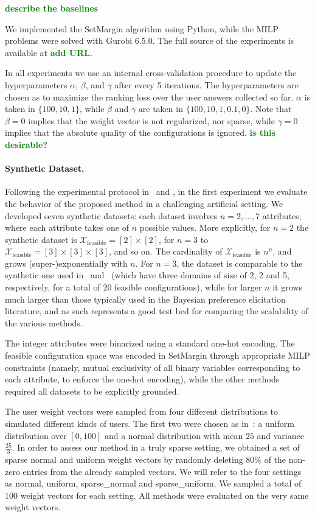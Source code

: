\documentclass{article}
\renewcommand\[{\begin{equation}}
\renewcommand\]{\end{equation}}
\newcommand{\calvar}[1]{\ensuremath{\mathcal{#1}}}
\newcommand{\calX}{\calvar{X}}
\newcommand{\stefano}[1]{{\bf \textcolor{green}{{\fbox{Stefano:} #1}}}}
\begin{document}
\stefano{describe the baselines}

We implemented the {\sc SetMargin} algorithm using Python, while the MILP
problems were solved with Gurobi 6.5.0. The full source of the experiments is
available at \stefano{add URL}.

In all experiments we use an internal cross-validation procedure to update the
hyperparameters $\alpha$, $\beta$, and $\gamma$ after every 5 iterations. The
hyperparameters are chosen as to maximize the ranking loss over the user
answers collected so far. $\alpha$ is taken in $\{100, 10, 1\}$,
while $\beta$ and $\gamma$ are taken in $\{100, 10, 1, 0.1, 0\}$. Note that
$\beta=0$ implies that the weight vector is not regularized, nor sparse, while
$\gamma=0$ implies that the absolute quality of the configurations is ignored.
\stefano{is this desirable?}

\paragraph{Synthetic Dataset.} Following the experimental protocol
in~\cite{guo2010real} and \cite{viappiani2010optimal}, in the first experiment
we evaluate the behavior of the proposed method in a challenging artificial
setting. We developed seven synthetic datasets: each dataset involves
$n=2,\ldots,7$ attributes, where each attribute takes one of $n$ possible
values. More explicitly, for $n=2$ the synthetic dataset is
$\calX_\text{feasible} = [2] \times [2]$, for $n=3$ to $\calX_\text{feasible} =
[3] \times [3] \times [3]$, and so on. The cardinality of
$\calX_\text{feasible}$ is $n^n$, and grows (super-)exponentially with $n$. For
$n=3$, the dataset is comparable to the synthetic one used
in~\cite{guo2010real} and~\cite{viappiani2010optimal} (which have three domains
of size of 2, 2 and 5, respectively, for a total of 20 feasible
configurations), while for larger $n$ it grows much larger than those typically
used in the Bayesian preference elicitation literature, and as such represents
a good test bed for comparing the scalability of the various methods.

The integer attributes were binarized using a standard one-hot encoding. The
feasible configuration space was encoded in {\sc SetMargin} through appropriate
MILP constraints (namely, mutual exclusivity of all binary variables
corresponding to each attribute, to enforce the one-hot encoding), while the
other methods required all datasets to be explicitly grounded.

The user weight vectors were sampled from four different distributions to
simulated different kinds of users. The first two were chosen as
in~\cite{guo2010real}: a uniform distribution over $[0, 100]$ and a normal
distribution with mean $25$ and variance $\frac{25}{3}$. In order to assess our
method in a truly sparse setting, we obtained a set of sparse normal and
uniform weight vectors by randomly deleting $80\%$ of the non-zero entries from
the already sampled vectors. We will refer to the four settings as {\sc
normal}, {\sc uniform}, {\sc sparse\_normal} and {\sc sparse\_uniform}. We
sampled a total of $100$ weight vectors for each setting. All methods were
evaluated on the very same weight vectors.
\end{document}
